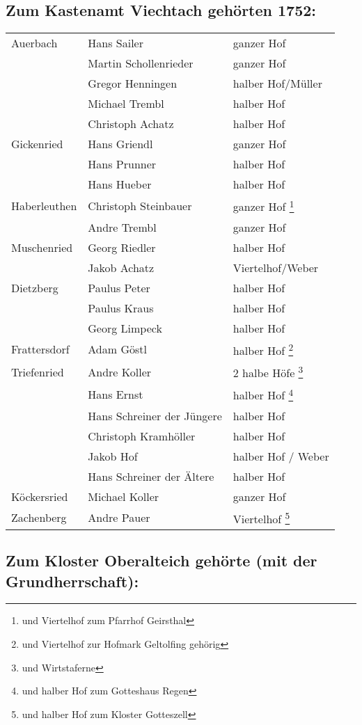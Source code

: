 \documentclass[12pt,a4pager,draft]{book}
\begin{document}
\subsection{Zum Kastenamt Viechtach gehörten 1752:}

\begin{longtable}{l|l|l}
Auerbach & Hans Sailer & ganzer Hof\\
& Martin Schollenrieder & ganzer Hof\\
& Gregor Henningen & halber Hof/Müller\\
& Michael Trembl & halber Hof\\
& Christoph Achatz & halber Hof\\
Gickenried & Hans Griendl & ganzer Hof\\
& Hans Prunner & halber Hof\\
& Hans Hueber & halber Hof\\
Haberleuthen & Christoph Steinbauer & ganzer Hof \footnote{und Viertelhof zum Pfarrhof Geirsthal}\\
& Andre Trembl & ganzer Hof\\
Muschenried & Georg Riedler & halber Hof\\
& Jakob Achatz & Viertelhof/Weber\\
Dietzberg & Paulus Peter & halber Hof\\
& Paulus Kraus & halber Hof\\
& Georg Limpeck & halber Hof\\
Frattersdorf & Adam Göstl & halber Hof \footnote{und Viertelhof zur Hofmark Geltolfing gehörig}\\
Triefenried & Andre Koller & 2 halbe Höfe \footnote{und Wirtstaferne}\\
& Hans Ernst & halber Hof \footnote{und halber Hof zum Gotteshaus Regen}\\
& Hans Schreiner der Jüngere & halber Hof\\
& Christoph Kramhöller & halber Hof\\
& Jakob Hof & halber Hof / Weber\\
& Hans Schreiner der Ältere & halber Hof\\
Köckersried & Michael Koller & ganzer Hof\\
Zachenberg & Andre Pauer & Viertelhof \footnote{und halber Hof zum Kloster Gotteszell}\\
\end{longtable}

\subsection{Zum Kloster Oberalteich gehörte (mit der Grundherrschaft):}
\end{document}
